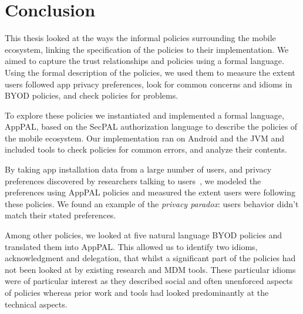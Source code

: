 \documentclass[thesis.tex]{subfiles}
\begin{document}
\chapter{Conclusion}


This thesis looked at the ways the informal policies surrounding the mobile
ecosystem, linking the specification of the policies to their implementation. We
aimed to capture the trust relationships and policies using a formal language.
Using the formal description of the policies, we used them to measure the extent
users followed app privacy preferences, look for common concerns and idioms in
BYOD policies, and check policies for problems.


To explore these policies we instantiated and implemented a formal language,
AppPAL, based on the SecPAL authorization language to describe the policies of
the mobile ecosystem. Our implementation ran on Android and the JVM and included
tools to check policies for common errors, and analyze their contents.

By taking app installation data from a large number of users, and privacy
preferences discovered by researchers talking to users~\cite{lin_modeling_2014},
we modeled the preferences using AppPAL policies and measured the extent users
were following these policies. We found an example of the \emph{privacy
paradox}: users behavior didn't match their stated preferences.

Among other policies, we looked at five natural language BYOD policies and
translated them into AppPAL. This allowed us to identify two idioms,
acknowledgment and delegation, that whilst a significant part of the policies
had not been looked at by existing research and \ac{MDM} tools. These particular
idioms were of particular interest as they described social and often unenforced
aspects of policies whereas prior work and tools had looked predominantly at
the technical aspects.

\end{document}
